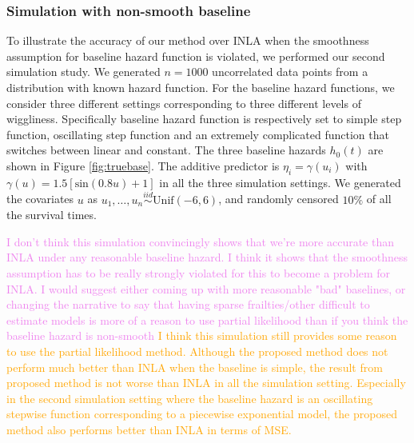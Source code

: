 \documentclass[ba]{imsart}
\newcommand{\alex}[1]{\textcolor{violet}{{ }#1}}
\newcommand{\ziang}[1]{\textcolor{orange}{{ }#1}}
\begin{document}
\subsubsection{Simulation with non-smooth baseline}\label{subsubsec:sim2}

To illustrate the accuracy of our method over INLA when the smoothness assumption for baseline hazard function is violated, we performed our second simulation study. We generated $n = 1000$ uncorrelated data points from a distribution with known hazard function. For the baseline hazard functions, we consider three different settings corresponding to three different levels of wiggliness. Specifically baseline hazard function is respectively set to simple step function, oscillating step function and an extremely complicated function that switches between linear and constant. The three baseline hazards $h_{0}(t)$ are shown in Figure \ref{fig:truebase}. The additive predictor is $\eta_{i} = \gamma\left(u_{i}\right)$ with $\gamma(u) = 1.5 [ \text{sin}(0.8u) + 1 ]$ in all the three simulation settings. We generated the covariates $u$ as  $u_{1},\ldots,u_{n}\overset{iid}{\sim}\text{Unif}(-6,6)$, and randomly censored $10\%$ of all the survival times.

\alex{I don't think this simulation convincingly shows that we're more accurate than INLA under any reasonable baseline hazard. I think it shows that the smoothness assumption has to be really strongly violated for this to become a problem for INLA. I would suggest either coming up with more reasonable "bad" baselines, or changing the narrative to say that having sparse frailties/other difficult to estimate models is more of a reason to use partial likelihood than if you think the baseline hazard is non-smooth}
\ziang{I think this simulation still provides some reason to use the partial likelihood method. Although the proposed method does not perform much better than INLA when the baseline is simple, the result from proposed method is not worse than INLA in all the simulation setting. Especially in the second simulation setting where the baseline hazard is an oscillating stepwise function corresponding to a piecewise exponential model, the proposed method also performs better than INLA in terms of MSE.}
\end{document}
